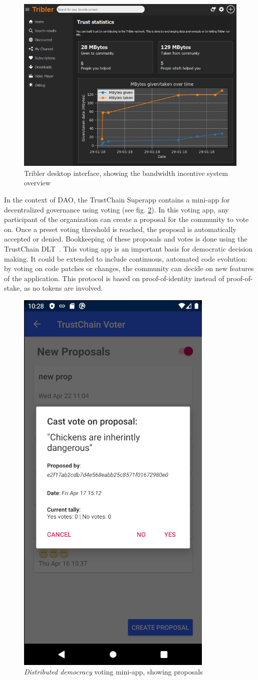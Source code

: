 \begin{figure}
        \includegraphics[width=1\linewidth]{related-work/tribler7.3.0.png}
        \caption{Tribler desktop interface, showing the bandwidth incentive system overview}
        \label{fig:tribler}
    \endminipage
\end{figure}

In the context of DAO, the TrustChain Superapp contains a mini-app for decentralized governance using voting (see fig. \ref{fig:trustchain-superapp-voter}). In this voting app, any participant of the organization can create a proposal for the community to vote on. Once a preset voting threshold is reached, the proposal is automatically accepted or denied. Bookkeeping of these proposals and votes is done using the TrustChain DLT~\citep{otte2017trustchain}. This voting app is an important basis for democratic decision making. It could be extended to include continuous, automated code evolution: by voting on code patches or changes, the community can decide on new features of the application. This protocol is based on proof-of-identity instead of proof-of-stake, as no tokens are involved.

\begin{figure}
    \centering
    \includegraphics[width=0.3\linewidth]{related-work/trustchain-superapp-voter.png}
    \caption{\textit{Distributed democracy} voting mini-app, showing proposals}
    \label{fig:trustchain-superapp-voter}
\end{figure}

